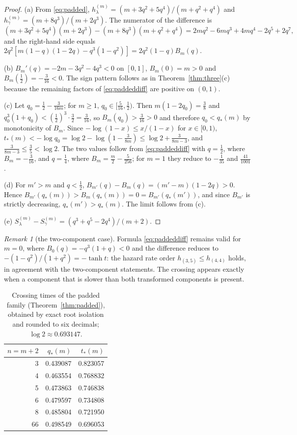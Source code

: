 \documentclass[10pt]{article}
\theoremstyle{plain}
\theoremstyle{definition}
\theoremstyle{remark}
\newtheorem{remark}[theorem]{Remark}
\begin{document}
\begin{proof}
(a) From \eqref{eq:padded}, $h^{(m)}_\lambda=(m+3q^2+5q^4)/(m+q^2+q^4)$ and $h^{(m)}_\gamma=(m+8q^3)/(m+2q^3)$. The numerator of the difference is
\[
(m+3q^2+5q^4)(m+2q^3)-(m+8q^3)(m+q^2+q^4)
=2mq^2-6mq^3+4mq^4-2q^5+2q^7 ,
\]
and the right-hand side equals $2q^2[m(1-q)(1-2q)-q^3(1-q^2)]=2q^2(1-q)B_m(q)$.

(b) $B_m'(q)=-2m-3q^2-4q^3<0$ on $[0,1]$, $B_m(0)=m>0$ and $B_m(\tfrac12)=-\tfrac{3}{16}<0$. The sign pattern follows as in Theorem~\ref{thm:three}(c) because the remaining factors of \eqref{eq:paddeddiff} are positive on $(0,1)$.

(c) Let $q_0=\tfrac12-\tfrac{3}{16m}$; for $m\ge 1$, $q_0\in[\tfrac{5}{16},\tfrac12)$. Then $m(1-2q_0)=\tfrac38$ and $q_0^3(1+q_0)<(\tfrac12)^3\cdot\tfrac32=\tfrac{3}{16}$, so $B_m(q_0)>\tfrac{3}{16}>0$ and therefore $q_0<q_*(m)$ by monotonicity of $B_m$. Since $-\log(1-x)\le x/(1-x)$ for $x\in[0,1)$, $t_*(m)<-\log q_0=\log 2-\log(1-\tfrac{3}{8m})\le\log 2+\tfrac{3}{8m-3}$, and $\tfrac{3}{8m-3}\le\tfrac35<\log 2$. The two values follow from \eqref{eq:paddeddiff} with $q=\tfrac12$, where $B_m=-\tfrac{3}{16}$, and $q=\tfrac14$, where $B_m=\tfrac m2-\tfrac{5}{256}$; for $m=1$ they reduce to $-\tfrac1{35}$ and $\tfrac{41}{1001}$.

(d) For $m'>m$ and $q<\tfrac12$, $B_{m'}(q)-B_m(q)=(m'-m)(1-2q)>0$. Hence $B_{m'}(q_*(m))>B_m(q_*(m))=0=B_{m'}(q_*(m'))$, and since $B_{m'}$ is strictly decreasing, $q_*(m')>q_*(m)$. The limit follows from (c).

(e) $S^{(m)}_\lambda-S^{(m)}_\gamma=(q^3+q^5-2q^4)/(m+2)$.
\end{proof}

\begin{remark}[the two-component case]\label{rem:twocomp}
Formula \eqref{eq:paddeddiff} remains valid for $m=0$, where $B_0(q)=-q^3(1+q)<0$ and the difference reduces to $-(1-q^2)/(1+q^2)=-\tanh t$: the hazard rate order $h_{(3,5)}\le h_{(4,4)}$ holds, in agreement with the two-component statements. The crossing appears exactly when a component that is slower than both transformed components is present.
\end{remark}

\begin{table}[t]
\centering
\caption{Crossing times of the padded family (Theorem~\ref{thm:padded}), obtained by exact root isolation and rounded to six decimals; $\log 2\approx 0.693147$.}
\label{tab:padded}
\begin{tabular}{@{}rrr@{}}
\toprule
$n=m+2$ & $q_*(m)$ & $t_*(m)$ \\
\midrule
3 & 0.439087 & 0.823057 \\
4 & 0.463554 & 0.768832 \\
5 & 0.473863 & 0.746838 \\
6 & 0.479597 & 0.734808 \\
8 & 0.485804 & 0.721950 \\
66 & 0.498549 & 0.696053 \\
\bottomrule
\end{tabular}
\end{table}
\end{document}

